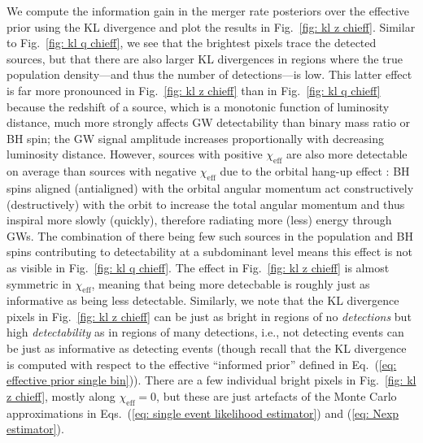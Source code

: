 \documentclass[%
reprint,
 amsmath,amssymb,
 aps,
 prd,nofootinbib,nobibnotes,
 superscriptaddress,groupedaddress,
]{revtex4-2}
\begin{document}
We compute the information gain in the merger rate posteriors over the effective prior using the KL divergence and plot the results in Fig.~\ref{fig: kl z chieff}. Similar to Fig.~\ref{fig: kl q chieff}, we see that the brightest pixels trace the detected sources, but that there are also larger KL divergences in regions where the true population density---and thus the number of detections---is low. This latter effect is far more pronounced in Fig.~\ref{fig: kl z chieff} than in Fig.~\ref{fig: kl q chieff} because the redshift of a source, which is a monotonic function of luminosity distance, much more strongly affects GW detectability than binary mass ratio or BH spin; the GW signal amplitude increases proportionally with decreasing luminosity distance. However, sources with positive $\chi_\mathrm{eff}$ are also more detectable on average than sources with negative $\chi_\mathrm{eff}$ due to the orbital hang-up effect \cite{Damour:2001tu, Campanelli:2006uy, Scheel:2014ina}: BH spins aligned (antialigned) with the orbital angular momentum act constructively (destructively) with the orbit to increase the total angular momentum and thus inspiral more slowly (quickly), therefore radiating more (less) energy through GWs. The combination of there being few such sources in the population and BH spins contributing to detectability at a subdominant level means this effect is not as visible in Fig.~\ref{fig: kl q chieff}. The effect in Fig.~\ref{fig: kl z chieff} is almost symmetric in $\chi_\mathrm{eff}$, meaning that being more detecbable is roughly just as informative as being less detectable. Similarly, we note that the KL divergence pixels in Fig.~\ref{fig: kl z chieff} can be just as bright in regions of no \textit{detections} but high \textit{detectability} as in regions of many detections, i.e., not detecting events can be just as informative as detecting events (though recall that the KL divergence is computed with respect to the effective ``informed prior'' defined in Eq.~(\ref{eq: effective prior single bin})). There are a few individual bright pixels in Fig.~\ref{fig: kl z chieff}, mostly along $\chi_\mathrm{eff}=0$, but these are just artefacts of the Monte Carlo approximations in Eqs.~(\ref{eq: single event likelihood estimator}) and (\ref{eq: Nexp estimator}).
\end{document}
